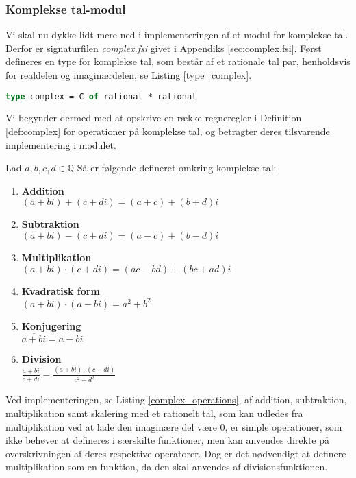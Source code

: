 \subsubsection{Komplekse tal-modul}
Vi skal nu dykke lidt mere ned i implementeringen af et modul for komplekse tal. Derfor er signaturfilen \textit{complex.fsi} givet i Appendiks \ref{sec:complex.fsi}. Først defineres en type for komplekse tal, som består af et rationale tal par, henholdsvis for realdelen og imaginærdelen, se Listing \ref{type_complex}.

\begin{lstlisting}[language={FSharp}, 
    label={type_complex},
    caption={Typen for komplekse tal}]
type complex = C of rational * rational
\end{lstlisting}

Vi begynder dermed med at opskrive en række regneregler i Definition \ref{def:complex} for operationer på komplekse tal, og betragter deres tilsvarende implementering i modulet. 
\vspace{0.5cm}
\begin{definition}\label{def:complex}
  Lad $a, b, c, d \in \mathbb{Q}$ Så er følgende defineret omkring komplekse tal:
  \begin{enumerate}
    \item \textbf{Addition} \\ $(a + bi) + (c + di) = (a + c) + (b + d)i$
    \item \textbf{Subtraktion} \\ $(a + bi) - (c + di) = (a - c) + (b - d)i$
    \item \textbf{Multiplikation} \\ $(a + bi) \cdot (c + di) = (ac - bd) + (bc + ad)i$
    \item \textbf{Kvadratisk form} \\ $ (a + bi) \cdot (a - bi) = a^2 + b^2$
    \item \textbf{Konjugering} \\ $\overline{a + bi} = a - bi$
    \item \textbf{Division} \\ $\frac{a + bi}{c + di} = \frac{(a + bi)\cdot(c - di)}{c^2 + d^2}$
  \end{enumerate}
\end{definition}

Ved implementeringen, se Listing \ref{complex_operations}, af addition, subtraktion, multiplikation samt skalering med et rationelt tal, som kan udledes fra multiplikation ved at lade den imaginære del være $0$, er simple operationer, som ikke behøver at defineres i særskilte funktioner, men kan anvendes direkte på overskrivningen af deres respektive operatorer. Dog er det nødvendigt at definere multiplikation som en funktion, da den skal anvendes af divisionsfunktionen. 

